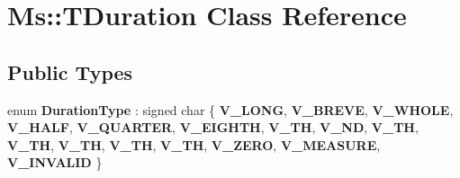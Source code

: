 \hypertarget{class_ms_1_1_t_duration}{}\section{Ms\+:\+:T\+Duration Class Reference}
\label{class_ms_1_1_t_duration}
\subsection*{Public Types}
\begin{DoxyCompactItemize}
\item 
\mbox{\label{class_ms_1_1_t_duration_ad9263bf173856b77421e83a48a7bf68c}} 
enum {\bfseries Duration\+Type} \+: signed char \{ \newline
{\bfseries V\+\_\+\+L\+O\+NG}, 
{\bfseries V\+\_\+\+B\+R\+E\+VE}, 
{\bfseries V\+\_\+\+W\+H\+O\+LE}, 
{\bfseries V\+\_\+\+H\+A\+LF}, 
\newline
{\bfseries V\+\_\+\+Q\+U\+A\+R\+T\+ER}, 
{\bfseries V\+\_\+\+E\+I\+G\+H\+TH}, 
{\bfseries V\+\_\+TH}, 
{\bfseries V\+\_\+ND}, 
\newline
{\bfseries V\+\_\+TH}, 
{\bfseries V\+\_\+TH}, 
{\bfseries V\+\_\+TH}, 
{\bfseries V\+\_\+TH}, 
\newline
{\bfseries V\+\_\+TH}, 
{\bfseries V\+\_\+\+Z\+E\+RO}, 
{\bfseries V\+\_\+\+M\+E\+A\+S\+U\+RE}, 
{\bfseries V\+\_\+\+I\+N\+V\+A\+L\+ID}
 \}
\end{DoxyCompactItemize}
